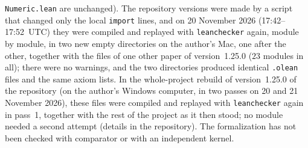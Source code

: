 \documentclass[11pt]{article}
\theoremstyle{definition}
\theoremstyle{remark}
\newcommand{\repoversion}{1.25.0}
\begin{document}
{\texttt{Numeric.lean} are unchanged). The repository versions were made by a script that changed only the local \texttt{import} lines, and on 20 November 2026 (17:42--17:52~UTC) they were compiled and replayed with \texttt{leanchecker} again, module by module, in two new empty directories on the author's Mac, one after the other, together with the files of one other paper of version~\repoversion{} ($23$ modules in all); there were no warnings, and the two directories produced identical \texttt{.olean} files and the same axiom lists. In the whole-project rebuild of version~\repoversion{} of the repository (on the author's Windows computer, in two passes on 20 and 21 November 2026), these files were compiled and replayed with \texttt{leanchecker} again in pass~1, together with the rest of the project as it then stood; no module needed a second attempt (details in the repository). The
formalization has not been checked with comparator or with an independent
kernel.

\par}
\end{document}
